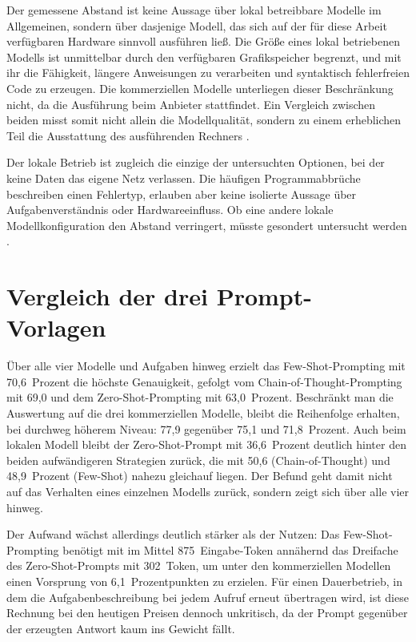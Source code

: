 Der gemessene Abstand ist keine Aussage über lokal betreibbare Modelle im Allgemeinen, sondern über dasjenige Modell, das sich auf der für diese Arbeit verfügbaren Hardware sinnvoll ausführen ließ. Die Größe eines lokal betriebenen Modells ist unmittelbar durch den verfügbaren Grafikspeicher begrenzt, und mit ihr die Fähigkeit, längere Anweisungen zu verarbeiten und syntaktisch fehlerfreien Code zu erzeugen. Die kommerziellen Modelle unterliegen dieser Beschränkung nicht, da die Ausführung beim Anbieter stattfindet. Ein Vergleich zwischen beiden misst somit nicht allein die Modellqualität, sondern zu einem erheblichen Teil die Ausstattung des ausführenden Rechners \autocite{zhaoSurveyLargeLanguage2026,2026AIIndex}.

Der lokale Betrieb ist zugleich die einzige der untersuchten Optionen, bei der keine Daten das eigene Netz verlassen. Die häufigen Programmabbrüche beschreiben einen Fehlertyp, erlauben aber keine isolierte Aussage über Aufgabenverständnis oder Hardwareeinfluss. Ob eine andere lokale Modellkonfiguration den Abstand verringert, müsste gesondert untersucht werden \autocite{zhaoSurveyLargeLanguage2026,2026AIIndex}.

\section{Vergleich der drei Prompt-Vorlagen}
\label{sec:vergleich-prompting}

Über alle vier Modelle und Aufgaben hinweg erzielt das Few-Shot-Prompting mit 70,6~Prozent die höchste Genauigkeit, gefolgt vom Chain-of-Thought-Prompting mit 69,0 und dem Zero-Shot-Prompting mit 63,0~Prozent. Beschränkt man die Auswertung auf die drei kommerziellen Modelle, bleibt die Reihenfolge erhalten, bei durchweg höherem Niveau: 77,9 gegenüber 75,1 und 71,8~Prozent. Auch beim lokalen Modell bleibt der Zero-Shot-Prompt mit 36,6~Prozent deutlich hinter den beiden aufwändigeren Strategien zurück, die mit 50,6 (Chain-of-Thought) und 48,9~Prozent (Few-Shot) nahezu gleichauf liegen. Der Befund geht damit nicht auf das Verhalten eines einzelnen Modells zurück, sondern zeigt sich über alle vier hinweg.

Der Aufwand wächst allerdings deutlich stärker als der Nutzen: Das Few-Shot-Prompting benötigt mit im Mittel 875~Eingabe-Token annähernd das Dreifache des Zero-Shot-Prompts mit 302~Token, um unter den kommerziellen Modellen einen Vorsprung von 6,1~Prozentpunkten zu erzielen. Für einen Dauerbetrieb, in dem die Aufgabenbeschreibung bei jedem Aufruf erneut übertragen wird, ist diese Rechnung bei den heutigen Preisen dennoch unkritisch, da der Prompt gegenüber der erzeugten Antwort kaum ins Gewicht fällt.

